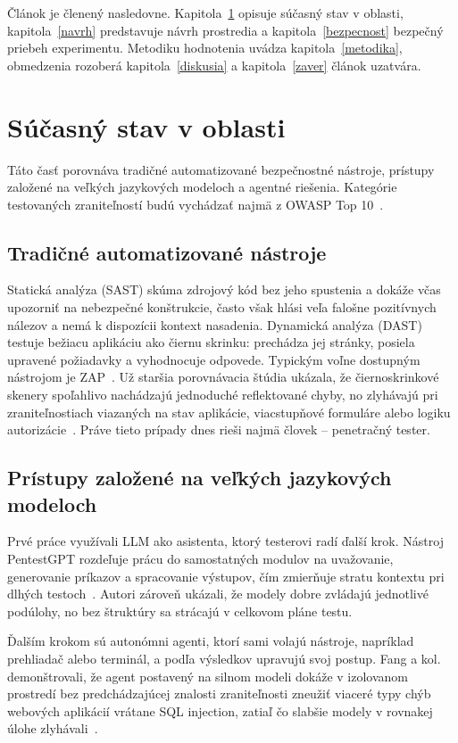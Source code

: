 \documentclass[10pt,twoside,slovak,a4paper]{article}
\begin{document}
Článok je členený nasledovne. Kapitola~\ref{sucasny-stav} opisuje súčasný stav v oblasti, kapitola~\ref{navrh} predstavuje návrh prostredia a kapitola~\ref{bezpecnost} bezpečný priebeh experimentu. Metodiku hodnotenia uvádza kapitola~\ref{metodika}, obmedzenia rozoberá kapitola~\ref{diskusia} a kapitola~\ref{zaver} článok uzatvára.

\section{Súčasný stav v oblasti}\label{sucasny-stav}
Táto časť porovnáva tradičné automatizované bezpečnostné nástroje, prístupy založené na veľkých jazykových modeloch a agentné riešenia. Kategórie testovaných zraniteľností budú vychádzať najmä z OWASP Top 10~\cite{OWASP-Top10}.

\subsection{Tradičné automatizované nástroje}\label{tradicne}
Statická analýza (SAST) skúma zdrojový kód bez jeho spustenia a dokáže včas upozorniť na nebezpečné konštrukcie, často však hlási veľa falošne pozitívnych nálezov a nemá k dispozícii kontext nasadenia. Dynamická analýza (DAST) testuje bežiacu aplikáciu ako čiernu skrinku: prechádza jej stránky, posiela upravené požiadavky a vyhodnocuje odpovede. Typickým voľne dostupným nástrojom je ZAP~\cite{ZAP}. Už staršia porovnávacia štúdia ukázala, že čiernoskrinkové skenery spoľahlivo nachádzajú jednoduché reflektované chyby, no zlyhávajú pri zraniteľnostiach viazaných na stav aplikácie, viacstupňové formuláre alebo logiku autorizácie~\cite{Doupe-Johnny}. Práve tieto prípady dnes rieši najmä človek -- penetračný tester.

\subsection{Prístupy založené na veľkých jazykových modeloch}\label{llm}
Prvé práce využívali LLM ako asistenta, ktorý testerovi radí ďalší krok. Nástroj PentestGPT rozdeľuje prácu do samostatných modulov na uvažovanie, generovanie príkazov a spracovanie výstupov, čím zmierňuje stratu kontextu pri dlhých testoch~\cite{Deng-PentestGPT}. Autori zároveň ukázali, že modely dobre zvládajú jednotlivé podúlohy, no bez štruktúry sa strácajú v celkovom pláne testu.

Ďalším krokom sú autonómni agenti, ktorí sami volajú nástroje, napríklad prehliadač alebo terminál, a podľa výsledkov upravujú svoj postup. Fang a kol. demonštrovali, že agent postavený na silnom modeli dokáže v izolovanom prostredí bez predchádzajúcej znalosti zraniteľnosti zneužiť viaceré typy chýb webových aplikácií vrátane SQL injection, zatiaľ čo slabšie modely v rovnakej úlohe zlyhávali~\cite{Fang-HackWebsites}.
\end{document}
